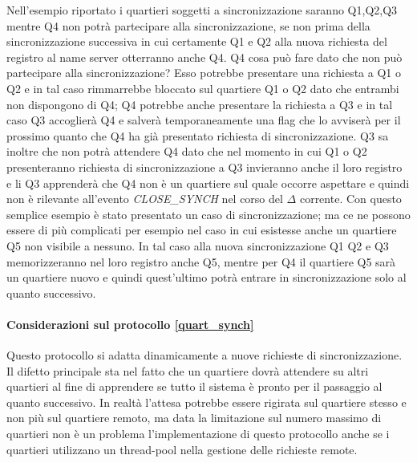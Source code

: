 Nell'esempio riportato i quartieri soggetti a sincronizzazione saranno Q1,Q2,Q3 mentre Q4 non potrà partecipare alla sincronizzazione, se non prima della sincronizzazione successiva in cui certamente Q1 e Q2 alla nuova richiesta del registro al name server otterranno anche Q4. Q4 cosa può fare dato che non può partecipare alla sincronizzazione? Esso potrebbe presentare una richiesta a Q1 o Q2 e in tal caso rimmarrebbe bloccato sul quartiere Q1 o Q2 dato che entrambi non dispongono di Q4; Q4 potrebbe anche presentare la richiesta a Q3 e in tal caso Q3 accoglierà Q4 e salverà temporaneamente una flag che lo avviserà per il prossimo quanto che Q4 ha già presentato richiesta di sincronizzazione. Q3 sa inoltre che non potrà attendere Q4 dato che nel momento in cui Q1 o Q2 presenteranno richiesta di sincronizzazione a Q3 invieranno anche il loro registro e li Q3 apprenderà che Q4 non è un quartiere sul quale occorre aspettare e quindi non è rilevante all'evento \textit{CLOSE\_SYNCH} nel corso del $\Delta$ corrente. Con questo semplice esempio è stato presentato un caso di sincronizzazione; ma ce ne possono essere di più complicati per esempio nel caso in cui esistesse anche un quartiere Q5 non visibile a nessuno. In tal caso alla nuova sincronizzazione Q1 Q2 e Q3 memorizzeranno nel loro registro anche Q5, mentre per Q4 il quartiere Q5 sarà un quartiere nuovo e quindi quest'ultimo potrà entrare in sincronizzazione solo al quanto successivo.

\paragraph{Considerazioni sul protocollo \ref{quart_synch}}
Questo protocollo si adatta dinamicamente a nuove richieste di sincronizzazione. Il difetto principale sta nel fatto che un quartiere dovrà attendere su altri quartieri al fine di apprendere se tutto il sistema è pronto per il passaggio al quanto successivo. In realtà l'attesa potrebbe essere rigirata sul quartiere stesso e non più sul quartiere remoto, ma data la limitazione sul numero massimo di quartieri non è un problema l'implementazione di questo protocollo anche se i quartieri utilizzano un thread-pool nella gestione delle richieste remote.